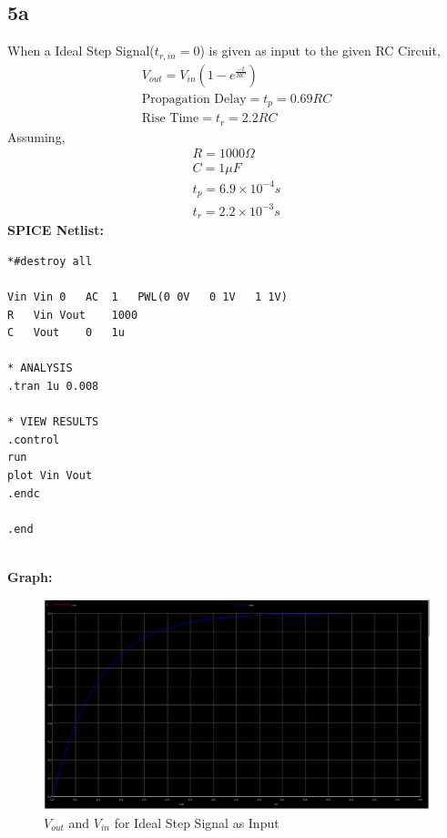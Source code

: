 \documentclass{article}
\begin{document}
\subsection{5a}
When a Ideal Step Signal($t_{r,in} = 0$) is given as input to the given RC Circuit,
\begin{align}
    V_{out} = V_{in}(1 - e^{\frac{-t}{RC}})\\
    \text{Propagation Delay} = t_{p} = 0.69RC \\
    \text{Rise Time} = t_{r} = 2.2RC
\end{align}
Assuming,
\begin{align}
    R = 1000 \Omega\\
    C = 1\mu F \\
    t_{p} = 6.9 \times 10^{-4} s\\
    t_{r} = 2.2 \times 10^{-3} s
\end{align}
\textbf{SPICE Netlist:}
\begin{lstlisting}
*#destroy all

Vin	Vin	0	AC	1	PWL(0 0V   0 1V   1 1V)
R	Vin	Vout	1000
C	Vout	0	1u

* ANALYSIS
.tran 1u 0.008

* VIEW RESULTS
.control
run
plot Vin Vout
.endc

.end
\end{lstlisting}\\
\textbf{Graph:}
\begin{figure}[!ht]
    \centering
    \includegraphics[scale=0.25]{Images/5a.png}
    \caption{$V_{out}$ and $V_{in}$ for Ideal Step Signal as Input}
\end{figure}
\end{document}
